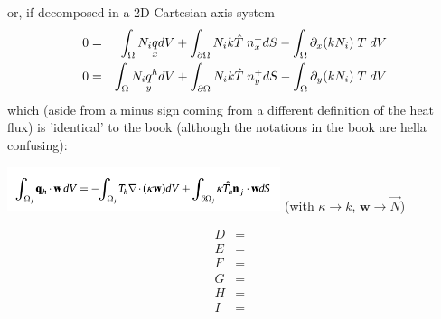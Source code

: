 or, if decomposed in a 2D Cartesian axis system 
\begin{eqnarray}
0
&=&\int_\Omega N_i  \underset{\tiny x}{q} dV 
+\int_{\partial\Omega} N_i k \hat{T} \; n^+_x dS
-\int_\Omega \partial_x ( k N_i) \;  T \; dV \nonumber\\
0
&=&\int_\Omega N_i  \underset{\tiny y}{q}^h dV 
+\int_{\partial\Omega} N_i k \hat{T} \; n^+_y dS
-\int_\Omega \partial_y (k N_i) \;  T \; dV \nonumber
\end{eqnarray}
which (aside from a minus sign coming from a different definition of the heat flux) is 'identical' to the book
(although the notations in the book are hella confusing):
\begin{center}
\includegraphics[width=8cm]{images/dgfem/li_02} (with $\kappa \rightarrow k$, ${\bm w}\rightarrow \vec{N}$)
\end{center}


\begin{eqnarray}
D &=&  \\
E &=&  \\
F &=&  \\
G &=&  \\
H &=&  \\
I &=&  \\
\end{eqnarray}
























